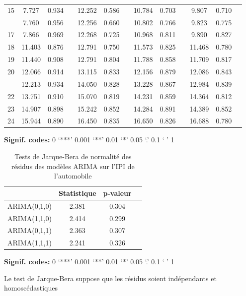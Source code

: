 \documentclass[]{article}
\begin{document}
\begin{table}[!h]
{\begin{threeparttable}
\begin{tabular}[t]{ccccccccccccc}
15 & 7.727 & 0.934 &  & 12.252 & 0.586 &  & 10.784 & 0.703 &  & 9.807 & 0.710 & \\
\addlinespace
16 & 7.760 & 0.956 &  & 12.256 & 0.660 &  & 10.802 & 0.766 &  & 9.823 & 0.775 & \\
17 & 7.866 & 0.969 &  & 12.268 & 0.725 &  & 10.968 & 0.811 &  & 9.890 & 0.827 & \\
18 & 11.403 & 0.876 &  & 12.791 & 0.750 &  & 11.573 & 0.825 &  & 11.468 & 0.780 & \\
19 & 11.440 & 0.908 &  & 12.791 & 0.804 &  & 11.788 & 0.858 &  & 11.709 & 0.817 & \\
20 & 12.066 & 0.914 &  & 13.115 & 0.833 &  & 12.156 & 0.879 &  & 12.086 & 0.843 & \\
\addlinespace
21 & 12.213 & 0.934 &  & 14.050 & 0.828 &  & 13.228 & 0.867 &  & 12.984 & 0.839 & \\
22 & 13.751 & 0.910 &  & 15.070 & 0.819 &  & 14.231 & 0.859 &  & 14.364 & 0.812 & \\
23 & 14.907 & 0.898 &  & 15.242 & 0.852 &  & 14.284 & 0.891 &  & 14.389 & 0.852 & \\
24 & 15.944 & 0.890 &  & 16.450 & 0.835 &  & 16.650 & 0.826 &  & 16.688 & 0.780 & \\
\bottomrule
\end{tabular}
\begin{tablenotes}
\item \hspace{-0.4cm}\textbf{Signif. codes: }0 `***' 0.001 `**' 0.01 `*' 0.05 `.' 0.1 ` ' 1
\end{tablenotes}
\end{threeparttable}}
\end{table}

\begin{table}[!h]

\caption{\label{tab:tabjb}Tests de Jarque-Bera de normalité des résidus des modèles ARIMA sur l'IPI de l'automobile}
\centering
\begin{threeparttable}
\begin{tabular}[t]{lccc}
\toprule
  & Statistique & p-valeur & \\
\midrule
ARIMA(0,1,0) & 2.381 & 0.304 & \\
ARIMA(1,1,0) & 2.414 & 0.299 & \\
ARIMA(0,1,1) & 2.363 & 0.307 & \\
ARIMA(1,1,1) & 2.241 & 0.326 & \\
\bottomrule
\end{tabular}
\begin{tablenotes}
\item \hspace{-0.4cm}\textbf{Signif. codes: }0 `***' 0.001 `**' 0.01 `*' 0.05 `.' 0.1 ` ' 1
\item Le test de Jarque-Bera suppose que les résidus soient indépendants et homoscédastiques
\end{tablenotes}
\end{threeparttable}
\end{table}
\end{document}
